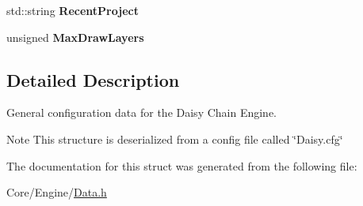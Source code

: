 \begin{DoxyCompactItemize}
\item 
\hypertarget{structDCEngine_1_1EngineConfig_a90bf2733f9c92084c32cf85b3589a24e}{std\-::string {\bfseries Recent\-Project}}\label{structDCEngine_1_1EngineConfig_a90bf2733f9c92084c32cf85b3589a24e}

\item 
\hypertarget{structDCEngine_1_1EngineConfig_acaabc3c020acfd499042c58fca96fc6a}{unsigned {\bfseries Max\-Draw\-Layers}}\label{structDCEngine_1_1EngineConfig_acaabc3c020acfd499042c58fca96fc6a}

\end{DoxyCompactItemize}


\subsection{Detailed Description}
General configuration data for the Daisy Chain Engine. 

\begin{DoxyNote}{Note}
This structure is deserialized from a config file called \char`\"{}\-Daisy.\-cfg\char`\"{} 
\end{DoxyNote}


The documentation for this struct was generated from the following file\-:\begin{DoxyCompactItemize}
\item 
Core/\-Engine/\hyperlink{Data_8h}{Data.\-h}\end{DoxyCompactItemize}
